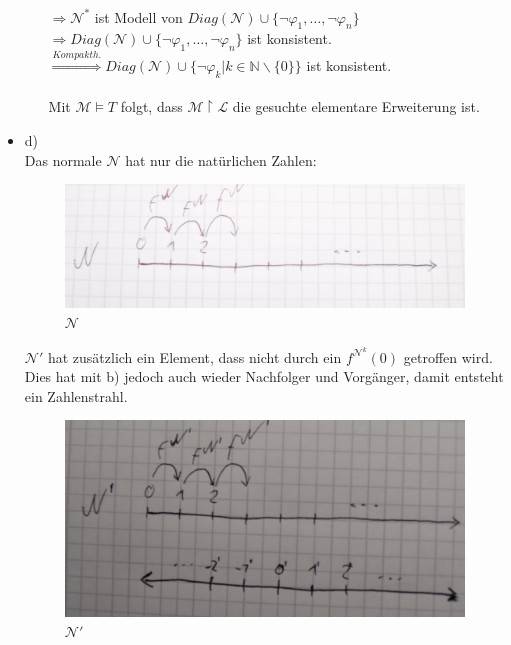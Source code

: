\documentclass[a4paper]{scrartcl}%
\begin{document}
\begin{itemize}
\begin{itemize}
                    \\$\Rightarrow \mathcal{N}^*$ ist Modell von $Diag(\mathcal{N}) \cup \{\neg \varphi_1, \dots, \neg \varphi_n\}$\\
                    $\Rightarrow Diag(\mathcal{N}) \cup \{\neg \varphi_1, \dots, \neg \varphi_n\}$ ist konsistent.\\
                    $\overset{Kompakth.}{\Rightarrow} Diag(\mathcal{N}) \cup \{\neg \varphi_k | k \in \mathds{N}\backslash\{0\}\}$ ist konsistent.\\
                    \\Mit $\mathcal{M} \vDash T$ folgt, dass $\mathcal{M} \upharpoonright \mathscr{L}$ die gesuchte elementare Erweiterung ist.\\
            \end{itemize}
        \item d)\\
            Das normale $\mathcal{N}$ hat nur die natürlichen Zahlen:\\
            \begin{figure}[H]
                \centering
                \includegraphics[scale=0.2]{./N.JPG}
                \caption{$\mathcal{N}$}
                \label{fig:./DSC_0580}
            \end{figure}

            $\mathcal{N}'$ hat zusätzlich ein Element, dass nicht durch ein $f^{\mathcal{N}^k}(0)$ getroffen wird.\\
            Dies hat mit b) jedoch auch wieder Nachfolger und Vorgänger, damit entsteht ein Zahlenstrahl.\\

            \begin{figure}[H]
                \centering
                \includegraphics[scale=0.2]{./N'.JPG}
                \caption{$\mathcal{N}'$}
                \label{fig:./DSC_0580}
            \end{figure}


\end{itemize}
\end{document}
